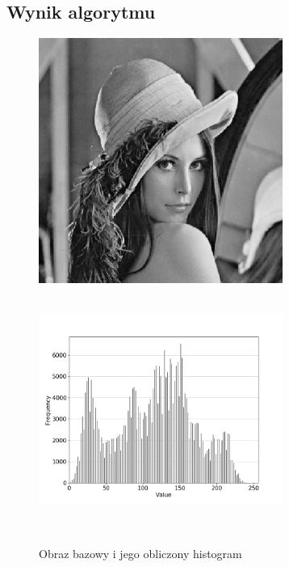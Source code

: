 \documentclass[a4paper,12pt]{book}
\begin{document}
\subsection*{Wynik algorytmu}
\begin{figure}[H]
	\caption{Obraz bazowy i jego obliczony histogram}
	\includegraphics[width=8cm, height=8cm]{lena-unmodified.png}
	\includegraphics[width=8cm, height=8cm]{5-1/calculate-lena.png}
	

\end{figure}
\end{document}
